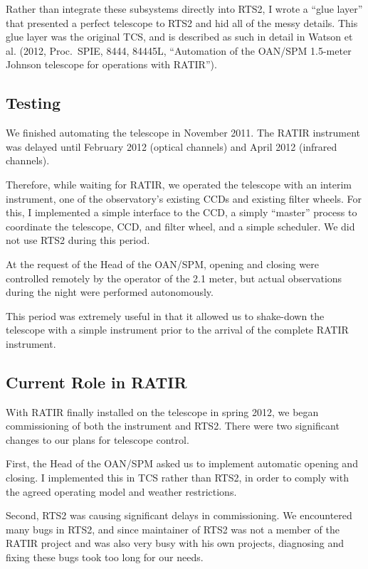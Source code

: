 \documentclass{article}
\begin{document}
Rather than integrate these subsystems directly into RTS2, I wrote a “glue layer” that presented a perfect telescope to RTS2 and hid all of the messy details. This glue layer was the original TCS, and is described as such in detail in Watson et al. (2012, Proc.\ SPIE, 8444, 84445L, “Automation of the OAN/SPM 1.5-meter Johnson telescope for operations with RATIR”).

\subsection{Testing}

We finished automating the telescope in November 2011. The RATIR instrument was delayed until February 2012 (optical channels) and April 2012 (infrared channels). 

Therefore, while waiting for RATIR, we operated the telescope with an interim instrument, one of the observatory’s existing CCDs and existing filter wheels. For this, I implemented a simple interface to the CCD, a simply “master” process to coordinate the telescope, CCD, and filter wheel, and a simple scheduler. We did not use RTS2 during this period.

At the request of the Head of the OAN/SPM, opening and closing were controlled remotely by the operator of the 2.1 meter, but actual observations during the night were performed autonomously. 

This period was extremely useful in that it allowed us to shake-down the telescope with a simple instrument prior to the arrival of the complete RATIR instrument.

\subsection{Current Role in RATIR}

With RATIR finally installed on the telescope in spring 2012, we began commissioning of both the instrument and RTS2. There were two significant changes to our plans for telescope control.

First, the Head of the OAN/SPM asked us to implement automatic opening and closing. I implemented this in TCS rather than RTS2, in order to comply with the agreed operating model and weather restrictions.

Second, RTS2 was causing significant delays in commissioning. We encountered many bugs in RTS2, and since maintainer of RTS2 was not a member of the RATIR project and was also very busy with his own projects, diagnosing and fixing these bugs took too long for our needs. 
\end{document}
